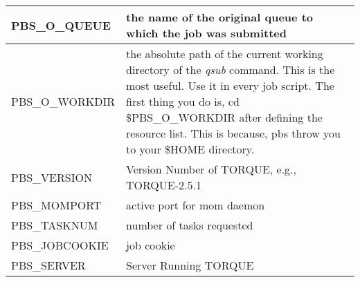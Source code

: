 \begin{longtable}{|p{}|p{}|}
PBS\_O\_QUEUE    & the name of the original queue to which the job was submitted \\ \hline
PBS\_O\_WORKDIR  & the absolute path of the current working directory of the \emph{qsub} command. This is the most useful. Use it in every job script. The first thing you do is, cd \$PBS\_O\_WORKDIR after defining the resource list. This is because, pbs throw you to your \$HOME directory. \\ \hline
PBS\_VERSION     & Version Number of TORQUE, e.g., TORQUE-2.5.1 \\ \hline
PBS\_MOMPORT     & active port for mom daemon \\ \hline
PBS\_TASKNUM     & number of tasks requested \\ \hline
PBS\_JOBCOOKIE   & job cookie \\ \hline
PBS\_SERVER      & Server Running TORQUE \\ \hline
\end{longtable}


